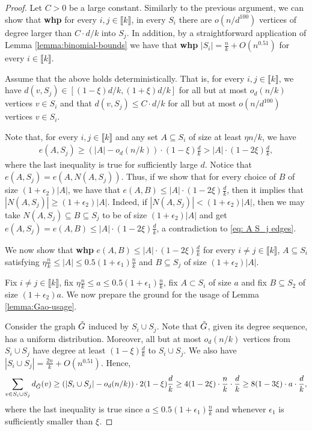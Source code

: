 \documentclass[notitlepage]{scrartcl}
\newcommand{\br}[1]{\llbracket{#1}\rrbracket}
\begin{document}
\begin{proof}
    Let $C > 0$ be a large constant. Similarly to the previous argument, we can show that \textbf{whp} for every $i, j\in\br{k}$, in every $S_i$ there are $o(n/d^{100})$ vertices of degree larger than $C \cdot d/k$ into $S_j$. In addition, by a straightforward application of Lemma \ref{lemma:binomial-bounds} we have that \textbf{whp} $|S_i| = \frac{n}{k} + O(n^{0.51})$ for every $i \in \br{k}$.

    Assume that the above holds deterministically. That is, for every $i, j \in \br{k}$, we have $d(v,S_j)\in \left[(1-\xi)d/k,(1+\xi)d/k\right]$ for all but at most $o_d(n/k)$ vertices $v \in S_i$ and that $d(v, S_j) \le C \cdot d/k$ for all but at most $o(n/d^{100})$ vertices $v \in S_i$.
    
    Note that, for every $i, j \in \br{k}$ and any set $A \subseteq S_i$ of size at least $\eta n/k$, we have 
    \begin{align}\label{eq: A S_j edges}
        e(A, S_j) \ge (|A| - o_d(n/k)) \cdot (1-\xi) \frac{d}{k} > |A| \cdot (1-2\xi) \frac{d}{k},
    \end{align}            
    where the last inequality is true for sufficiently large $d$. Notice that $e(A, S_j)=e(A, N(A,S_j))$. Thus, if we show that for every choice of $B$ of size $(1+\epsilon_2) |A|$, we have that $e(A, B) \le |A| \cdot (1-2\xi) \frac{d}{k}$, then it implies that $|N(A, S_j)| \ge (1 + \epsilon_2) |A|$. Indeed, if $|N(A, S_j)| < (1 + \epsilon_2) |A|$, then we may take $N(A, S_j) \subseteq B \subseteq S_j$ to be of size $(1+\epsilon_2) |A|$ and get $e(A, S_j) = e(A, B) \le |A| \cdot (1-2\xi) \frac{d}{k}$, a contradiction to \eqref{eq: A S_j edges}.

    We now show that \textbf{whp} $e(A, B) \le |A| \cdot (1-2\xi) \frac{d}{k}$ for every $i \neq j \in \br{k}$, $A \subseteq S_i$ satisfying $\eta \frac{n}{k} \le |A| \le 0.5(1 + \epsilon_1)\frac{n}{k}$ and $B \subseteq S_j$ of size $(1 + \epsilon_2) |A|$.
    
    Fix $i \neq j \in \br{k}$, fix $\eta \frac{n}{k} \le a \le 0.5(1 + \epsilon_1)\frac{n}{k}$, fix $A \subset S_i$ of size $a$ and fix $B \subseteq S_2 $ of size $(1 + \epsilon_2)a$. We now prepare the ground for the usage of Lemma \ref{lemma:Gao-usage}.
    
    Consider the graph $\Tilde{G}$ induced by $S_i \cup S_j$. Note that $\Tilde{G}$, given its degree sequence, has a uniform distribution. Moreover, all but at most $o_d(n/k)$ vertices from $S_i \cup S_j$ have degree at least $(1-\xi) \frac{d}{k}$ to $S_i \cup S_j$. We also have $|S_i \cup S_j| = \frac{2n}{k} + O(n^{0.51})$. Hence,
    \begin{align*}
        \sum_{v \in S_i \cup S_j} d_{\Tilde{G}}(v) \ge \left(|S_i \cup S_j| -o_d(n/k)\right) \cdot 2(1-\xi) \frac{d}{k} \ge 4(1-2\xi) \cdot \frac{n}{k} \cdot \frac{d}{k} \ge 8(1-3\xi) \cdot a \cdot \frac{d}{k},
    \end{align*}
    where the last inequality is true since $a \le 0.5(1+\epsilon_1) \frac{n}{k}$ and whenever $\epsilon_1$ is sufficiently smaller than $\xi$.


\end{proof}
\end{document}
